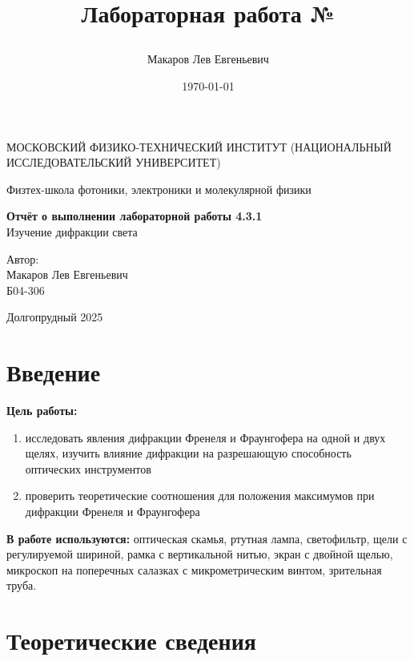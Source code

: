 \documentclass[a4paper,12pt]{article}
\author{Макаров Лев Евгеньевич}
\title{Лабораторная работа №\labnumber

\labname
}
\date{\today}
\newcommand\labname{Изучение дифракции света}
\newcommand\labnumber{4.3.1}
\begin{document}
\begin{titlepage}
	\begin{center}
		{\large МОСКОВСКИЙ ФИЗИКО-ТЕХНИЧЕСКИЙ ИНСТИТУТ (НАЦИОНАЛЬНЫЙ ИССЛЕДОВАТЕЛЬСКИЙ УНИВЕРСИТЕТ)}
	\end{center}
	\begin{center}
		{\large Физтех-школа фотоники, электроники и молекулярной физики}
	\end{center}
	
	
	\vspace{4.5cm}
	{\huge
		\begin{center}
			{\bf Отчёт о выполнении лабораторной работы \labnumber}\\
			\labname
		\end{center}
	}
	\vspace{2cm}
	\begin{flushright}
		{\LARGE Автор:\\ Макаров Лев Евгеньевич \\
			\vspace{0.2cm}
			Б04-306}
	\end{flushright}
	\vspace{8cm}
	\begin{center}
		Долгопрудный 2025
	\end{center}
\end{titlepage}

\section{Введение}

\textbf{Цель работы:} 
\begin{enumerate}
	\item исследовать явления дифракции Френеля и Фраунгофера на одной и двух щелях, изучить влияние дифракции на разрешающую способность оптических инструментов
    \item проверить теоретические соотношения для положения максимумов при дифракции Френеля и Фраунгофера
\end{enumerate}

\textbf{В работе используются:} оптическая скамья, ртутная лампа, светофильтр, щели с регулируемой шириной, рамка с вертикальной нитью, экран с двойной щелью, микроскоп на поперечных салазках с микрометрическим винтом, зрительная труба.

\section{Теоретические сведения}
\end{document}
